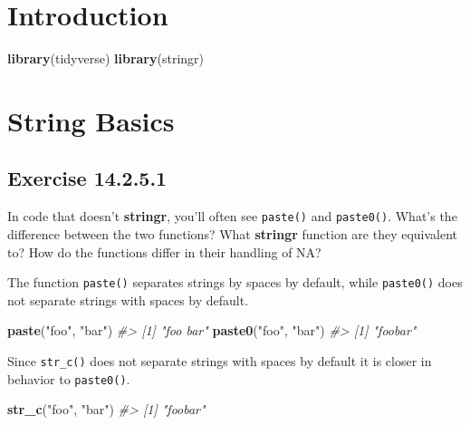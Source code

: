 \documentclass[]{book}
\newenvironment{Shaded}{\begin{snugshade}}{\end{snugshade}}
\newcommand{\CommentTok}[1]{\textcolor[rgb]{0.56,0.35,0.01}{\textit{#1}}}
\newcommand{\KeywordTok}[1]{\textcolor[rgb]{0.13,0.29,0.53}{\textbf{#1}}}
\newcommand{\NormalTok}[1]{#1}
\newcommand{\StringTok}[1]{\textcolor[rgb]{0.31,0.60,0.02}{#1}}
\theoremstyle{plain}
\theoremstyle{remark}
\begin{document}
\hypertarget{introduction-9}{%
\section{Introduction}\label{introduction-9}}

\begin{Shaded}
\begin{Highlighting}[]
\KeywordTok{library}\NormalTok{(tidyverse)}
\KeywordTok{library}\NormalTok{(stringr)}
\end{Highlighting}
\end{Shaded}

\hypertarget{string-basics}{%
\section{String Basics}\label{string-basics}}

\hypertarget{exercise-14.2.5.1}{%
\subsection*{\texorpdfstring{Exercise
{14.2.5.1}}{Exercise 14.2.5.1}}\label{exercise-14.2.5.1}}

In code that doesn't \textbf{stringr}, you'll often see \texttt{paste()}
and \texttt{paste0()}. What's the difference between the two functions?
What \textbf{stringr} function are they equivalent to? How do the
functions differ in their handling of NA?

The function \texttt{paste()} separates strings by spaces by default,
while \texttt{paste0()} does not separate strings with spaces by
default.

\begin{Shaded}
\begin{Highlighting}[]
\KeywordTok{paste}\NormalTok{(}\StringTok{"foo"}\NormalTok{, }\StringTok{"bar"}\NormalTok{)}
\CommentTok{#> [1] "foo bar"}
\KeywordTok{paste0}\NormalTok{(}\StringTok{"foo"}\NormalTok{, }\StringTok{"bar"}\NormalTok{)}
\CommentTok{#> [1] "foobar"}
\end{Highlighting}
\end{Shaded}

Since \texttt{str\_c()} does not separate strings with spaces by default
it is closer in behavior to \texttt{paste0()}.

\begin{Shaded}
\begin{Highlighting}[]
\KeywordTok{str_c}\NormalTok{(}\StringTok{"foo"}\NormalTok{, }\StringTok{"bar"}\NormalTok{)}
\CommentTok{#> [1] "foobar"}
\end{Highlighting}
\end{Shaded}
\end{document}
